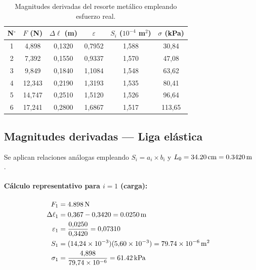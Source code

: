 \begin{table}[H]
    \centering
    \caption{Magnitudes derivadas del resorte metálico empleando esfuerzo real.}
    \label{tab:deriv_resorte}
    \begin{tabular}{cccccc}
        \toprule
        \textbf{N$^{\circ}$}
            & \textbf{$F$ (N)}
            & \textbf{$\Delta\ell$ (m)}
            & \textbf{$\varepsilon$}
            & \textbf{$S_i$ ($10^{-4}$ m$^2$)}
            & \textbf{$\sigma$ (kPa)} \\
        \midrule
        1 &  4{,}898 & 0{,}1320 & 0{,}7952 & 1{,}588 &  30{,}84 \\
        2 &  7{,}392 & 0{,}1550 & 0{,}9337 & 1{,}570 &  47{,}08 \\
        3 &  9{,}849 & 0{,}1840 & 1{,}1084 & 1{,}548 &  63{,}62 \\
        4 & 12{,}343 & 0{,}2190 & 1{,}3193 & 1{,}535 &  80{,}41 \\
        5 & 14{,}747 & 0{,}2510 & 1{,}5120 & 1{,}526 &  96{,}64 \\
        6 & 17{,}241 & 0{,}2800 & 1{,}6867 & 1{,}517 & 113{,}65 \\
        \bottomrule
    \end{tabular}
\end{table}

\subsection{Magnitudes derivadas — Liga elástica}

Se aplican relaciones análogas empleando $S_i = a_i \times b_i$ 
y $L_0 = \qty{34{,}20}{cm} = \qty{0{,}3420}{m}$.

\paragraph{Cálculo representativo para $i = 1$ (carga):}

\begin{align*}
    F_1          &= \qty{4{,}898}{N}\\
    \Delta\ell_1 &= 0{,}367 - 0{,}3420 = \qty{0{,}0250}{m}\\
    \varepsilon_1 &= \frac{0{,}0250}{0{,}3420} = 0{,}07310\\
    S_1 &= (14{,}24\times10^{-3})(5{,}60\times10^{-3}) = \qty{79{,}74e-6}{m^2}\\
    \sigma_1  &= \frac{4{,}898}{79{,}74\times10^{-6}} = \qty{61{,}42}{kPa}
\end{align*}

